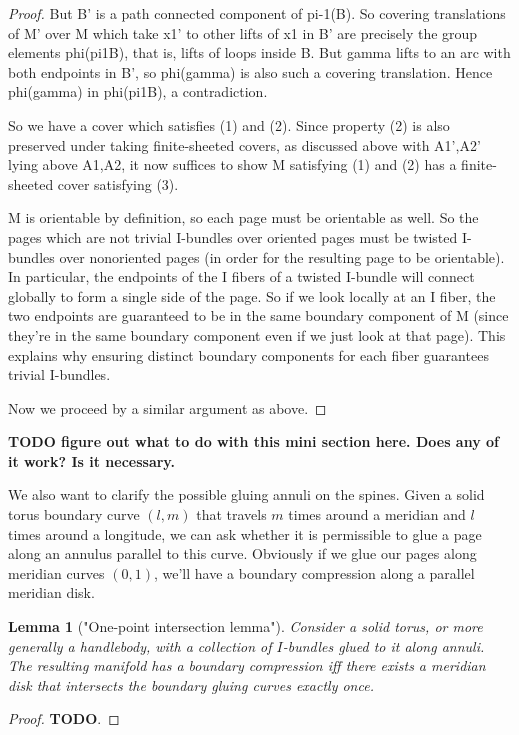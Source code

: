 \documentclass[12pt]{amsart}
\newtheorem{lemma}[theorem]{Lemma}
\theoremstyle{definition}
\theoremstyle{remark}
\begin{document}
\begin{proof}
But B' is a path connected component of pi-1(B). So covering translations of M'
over M which take x1' to other lifts of x1 in B' are precisely the group
elements phi(pi1B), that is, lifts of loops inside B. But gamma lifts to an arc
with both endpoints in B', so phi(gamma) is also such a covering translation.
Hence phi(gamma) in phi(pi1B), a contradiction.

So we have a cover which satisfies (1) and (2). Since property (2) is also
preserved under taking finite-sheeted covers, as discussed above with A1',A2'
lying above A1,A2, it now suffices to show M satisfying (1) and (2) has
a finite-sheeted cover satisfying (3).

M is orientable by definition, so each page must be orientable as well. So the
pages which are not trivial I-bundles over oriented pages must be twisted
I-bundles over nonoriented pages (in order for the resulting page to be
orientable). In particular, the endpoints of the I fibers of a twisted I-bundle
will connect globally to form a single side of the page. So if we look locally
at an I fiber, the two endpoints are guaranteed to be in the same boundary
component of M (since they're in the same boundary component even if we just
look at that page). This explains why ensuring distinct boundary components for
each fiber guarantees trivial I-bundles.

Now we proceed by a similar argument as above.

\end{proof}

{\tiny

\textbf{TODO figure out what to do with this mini section here. Does any of it
work? Is it necessary.}

We also want to clarify the possible gluing annuli on the spines. Given a solid
torus boundary curve $(l,m)$ that travels $m$ times around a meridian and $l$
times around a longitude, we can ask whether it is permissible to glue a page
along an annulus parallel to this curve. Obviously if we glue our pages along
meridian curves $(0,1)$, we'll have a boundary compression along a parallel
meridian disk.


\begin{lemma}["One-point intersection lemma"]

Consider a solid torus, or more generally a handlebody, with a collection of
$I$-bundles glued to it along annuli. The resulting manifold has a boundary
compression iff there exists a meridian disk that intersects the boundary
gluing curves exactly once.

\end{lemma}

\begin{proof}

\textbf{TODO}.

\end{proof}

}
\end{document}
